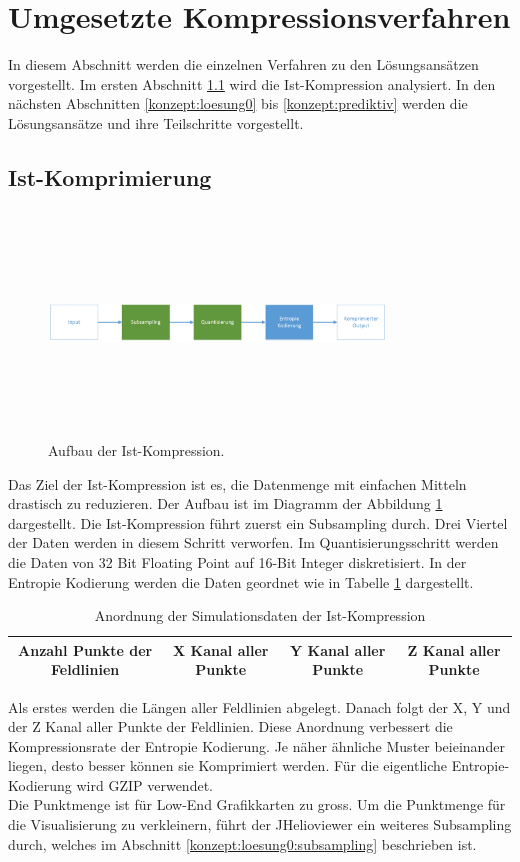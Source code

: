 \section{Umgesetzte Kompressionsverfahren} \label{konzept}
In diesem Abschnitt werden die einzelnen Verfahren zu den Lösungsansätzen vorgestellt. Im ersten Abschnitt \ref{konzept:ist-komprimierung} wird die Ist-Kompression analysiert. In den nächsten Abschnitten \ref{konzept:loesung0} bis \ref{konzept:prediktiv} werden die Lösungsansätze und ihre Teilschritte vorgestellt.

\subsection{Ist-Komprimierung} \label{konzept:ist-komprimierung}
\begin{figure}[!htbp]
	\center
	\includegraphics[width=0.8\textwidth,height=6cm,keepaspectratio]{./pictures/konzept/ist/aufbau.png}
	\caption{Aufbau der Ist-Kompression.}
	\label{konzept:ist:aufbau:diagramm}
\end{figure}
Das Ziel der Ist-Kompression ist es, die Datenmenge mit einfachen Mitteln drastisch zu reduzieren. Der Aufbau ist im Diagramm der Abbildung \ref{konzept:ist:aufbau:diagramm} dargestellt. Die Ist-Kompression führt zuerst ein Subsampling durch. Drei Viertel der Daten werden in diesem Schritt verworfen. Im Quantisierungsschritt werden die Daten von 32 Bit Floating Point auf 16-Bit Integer diskretisiert. In der Entropie Kodierung werden die Daten geordnet wie in Tabelle \ref{konzept:ist:entropie} dargestellt.
\begin{table}[!htbp]
	\center
	\begin{tabular}{|c|c|c|c|}
	\hline
	Anzahl Punkte der Feldlinien & X Kanal aller Punkte & Y Kanal aller Punkte & Z Kanal aller Punkte \\\hline
	\end{tabular}
	\caption{Anordnung der Simulationsdaten der Ist-Kompression}
	\label{konzept:ist:entropie}
\end{table}
Als erstes werden die Längen aller Feldlinien abgelegt. Danach folgt der X, Y und der Z Kanal aller Punkte der Feldlinien. Diese Anordnung verbessert die Kompressionsrate der Entropie Kodierung. Je näher ähnliche Muster beieinander liegen, desto besser können sie Komprimiert werden. Für die eigentliche Entropie-Kodierung wird GZIP verwendet.\\
Die Punktmenge ist für Low-End Grafikkarten zu gross. Um die Punktmenge für die Visualisierung zu verkleinern, führt der JHelioviewer ein weiteres Subsampling durch, welches im Abschnitt \ref{konzept:loesung0:subsampling} beschrieben ist.

